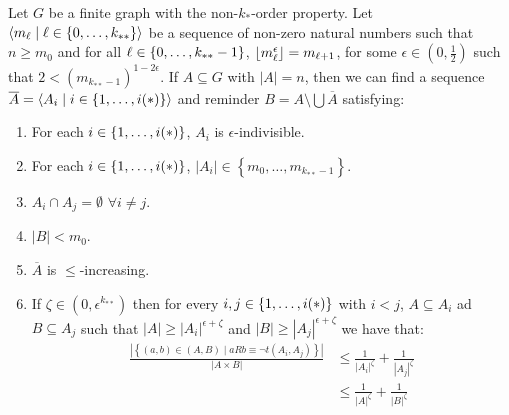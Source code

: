     \lemma[Claim 4.10]
        Let $G$ be a finite graph with the non-$k_{*}$-order property.
        Let $\left< m_\ell \mid \ell \in \left\{ 0, \dots, k_{**} \right\} \right>$ be a sequence of non-zero natural numbers such that
        $n \geq m_0$ and for all $\ell \in \left\{ 0, \dots, k_{**}-1 \right\}$, $\left\lfloor m_\ell^\epsilon \right\rfloor = m_{\ell+1}$,
        for some $\epsilon \in (0, \frac{1}{2})$ such that $2 < (m_{k_{**}-1})^{1-2\epsilon}$.
        If $A \subseteq G$ with $|A| = n$, then we can find a sequence $\overline{A} = \left< A_i \mid i \in \left\{ 1, \dots, i(*) \right\} \right>$
        and reminder $B = A \setminus \bigcup \overline{A}$ satisfying:
        \begin{enumerate}
            \item \label{itm:4.10.1} For each $i \in \left\{ 1, \dots, i(*) \right\}$, $A_i$ is $\epsilon$-indivisible.
            \item \label{itm:4.10.2} For each $i \in \left\{ 1, \dots, i(*) \right\}$, $|A_i| \in \left\{ m_0, \dots, m_{k_{**}-1} \right\}$.
            \item \label{itm:4.10.3} $A_i \cap A_j = \emptyset$ $\forall i \neq j$.
            \item \label{itm:4.10.4} $|B| < m_0$.
            \item \label{itm:4.10.5} $\overline{A}$ is $\leq$-increasing.
            \item \label{itm:4.10.6} If $\zeta \in \left(0,\epsilon^{k_{**}}\right)$ then for every $i,j \in \left\{ 1, \dots, i(*) \right\}$ with $i < j$,
                $A \subseteq A_i$ ad $B \subseteq A_j$ such that $|A| \geq |A_i|^{\epsilon + \zeta}$ and $|B| \geq |A_j|^{\epsilon + \zeta}$
                we have that:
                \[
                    \begin{split}
                        \frac{|\left\{ (a,b) \in (A,B) \mid a R b \equiv \neg t(A_i,A_j) \right\}|}{|A \times B|}
                            &\leq \frac{1}{|A_i|^\zeta} + \frac{1}{|A_j|^\zeta} \\
                            &\leq \frac{1}{|A|^\zeta} + \frac{1}{|B|^\zeta}
                    \end{split}
                \]
        \end{enumerate}

